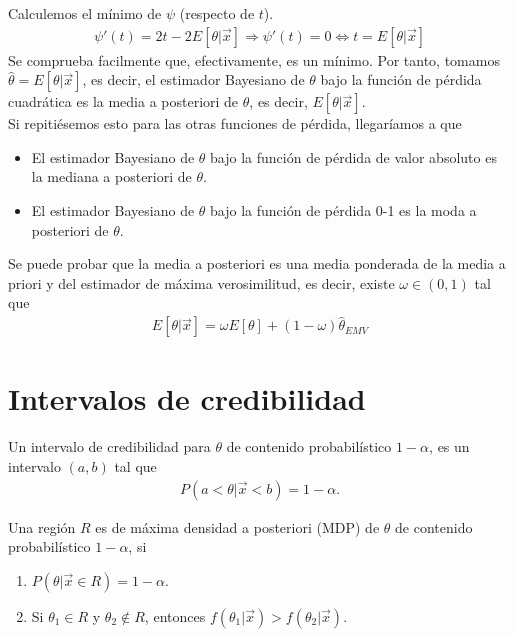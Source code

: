 Calculemos el mínimo de $\psi$ (respecto de $t$).
\begin{align*}
    \psi'(t) = 2t - 2E[\theta | \vec{x}] \Longrightarrow \psi'(t) = 0 \Longleftrightarrow t = E[\theta | \vec{x}]
\end{align*}
Se comprueba facilmente que, efectivamente, es un mínimo. Por tanto, tomamos $\widehat{\theta} = E[\theta | \vec{x}]$, es decir, el estimador Bayesiano de $\theta$ bajo la función de pérdida cuadrática es la media a posteriori de $\theta$, es decir, $E[\theta | \vec{x}]$.
\\
\newline
Si repitiésemos esto para las otras funciones de pérdida, llegaríamos a que 
\begin{itemize}
    \item El estimador Bayesiano de $\theta$ bajo la función de pérdida de valor absoluto es la mediana a posteriori de $\theta$.
    \item El estimador Bayesiano de $\theta$ bajo la función de pérdida 0-1 es la moda a posteriori de $\theta$.
\end{itemize}

\begin{obs}
    Se puede probar que la media a posteriori es una media ponderada de la media a priori y del estimador de máxima verosimilitud, es decir, existe $\omega \in (0,1)$ tal que
    \begin{align*}
        E[\theta | \vec{x}] = \omega E[\theta] + (1 - \omega) \widehat{\theta}_{EMV}
    \end{align*}
\end{obs}

\section{Intervalos de credibilidad}

\begin{defi}
    Un intervalo de credibilidad para $\theta$ de contenido probabilístico $1 - \alpha$, es un intervalo $(a,b)$ tal que
    \begin{align*}
        P(a < \theta | \vec{x} < b) = 1 - \alpha.
    \end{align*}
\end{defi}

\begin{defi}
    Una región $R$ es de máxima densidad a posteriori (MDP) de $\theta$ de contenido probabilístico $1-\alpha$, si
    \begin{enumerate}
        \item $P(\theta | \vec{x} \in R) = 1 - \alpha$.
        \item Si $\theta_1 \in R$ y $\theta_2 \not \in R$, entonces $f(\theta_1 | \vec{x}) > f(\theta_2 | \vec{x})$.
    \end{enumerate}
\end{defi}

